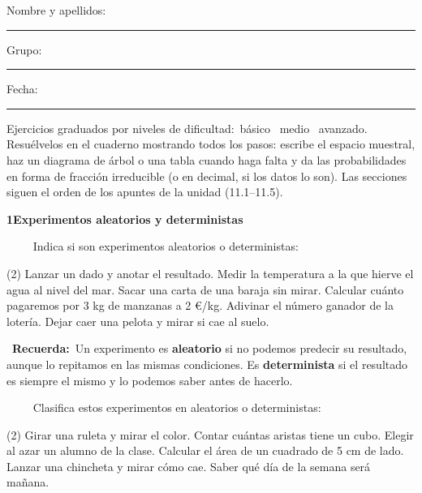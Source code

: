 \documentclass[11pt,a4paper]{article}
\newcommand{\estrelles}[1]{{\color{accent}\ifcase#1\or\faStar\faStar[regular]\faStar[regular]\or\faStar\faStar\faStar[regular]\or\faStar\faStar\faStar\fi}}
\newcounter{exer}
\newcommand{\ex}[1]{\par\needspace{4\baselineskip}\medskip\stepcounter{exer}\noindent{\color{navy}\bfseries\theexer.}\ \ {\small\estrelles{#1}}\ \ }
\newcommand{\seccio}[2]{\par\needspace{10\baselineskip}\bigskip
  \begin{tcolorbox}[colback=navy,colframe=navy,coltext=white,arc=2mm,boxrule=0pt,left=3mm,right=3mm,top=1.2mm,bottom=1.2mm]
  {\large\bfseries #1\quad #2}
  \end{tcolorbox}\vspace{-2pt}}
\newcommand{\recorda}[1]{\par\smallskip\begin{tcolorbox}[colback=accent!7,colframe=accent!55,arc=2mm,boxrule=0.5pt,left=2.5mm,right=2.5mm,top=1mm,bottom=1mm]\small{\color{accent}\faLightbulb[regular]}\ \textbf{Recuerda:}\ #1\end{tcolorbox}}
\begin{document}
\thispagestyle{primera}

\vspace{10pt}
Nombre y apellidos: \rule{6.6cm}{0.4pt}\hfill Grupo: \rule{1.6cm}{0.4pt}\hfill Fecha: \rule{2.2cm}{0.4pt}
\vspace{8pt}

\begin{tcolorbox}[colback=soft,colframe=soft,arc=2mm,left=3mm,right=3mm,top=1.5mm,bottom=1.5mm]
\small Ejercicios graduados por niveles de dificultad:\quad \estrelles{1}\ básico \qquad \estrelles{2}\ medio \qquad \estrelles{3}\ avanzado.\\[2pt] Resuélvelos en el cuaderno mostrando todos los pasos: escribe el espacio muestral, haz un diagrama de árbol o una tabla cuando haga falta y da las probabilidades en forma de fracción irreducible (o en decimal, si los datos lo son). Las secciones siguen el orden de los apuntes de la unidad (11.1--11.5).
\end{tcolorbox}

\seccio{1}{Experimentos aleatorios y deterministas}

\ex{1} Indica si son experimentos aleatorios o deterministas:\begin{tasks}(2)
  \task Lanzar un dado y anotar el resultado.
  \task Medir la temperatura a la que hierve el agua al nivel del mar.
  \task Sacar una carta de una baraja sin mirar.
  \task Calcular cuánto pagaremos por 3 kg de manzanas a 2 €/kg.
  \task Adivinar el número ganador de la lotería.
  \task Dejar caer una pelota y mirar si cae al suelo.
\end{tasks}\recorda{Un experimento es \textbf{aleatorio} si no podemos predecir su resultado, aunque lo repitamos en las mismas condiciones. Es \textbf{determinista} si el resultado es siempre el mismo y lo podemos saber antes de hacerlo.}

\ex{1} Clasifica estos experimentos en aleatorios o deterministas:\begin{tasks}(2)
  \task Girar una ruleta y mirar el color.
  \task Contar cuántas aristas tiene un cubo.
  \task Elegir al azar un alumno de la clase.
  \task Calcular el área de un cuadrado de 5 cm de lado.
  \task Lanzar una chincheta y mirar cómo cae.
  \task Saber qué día de la semana será mañana.
\end{tasks}
\end{document}
